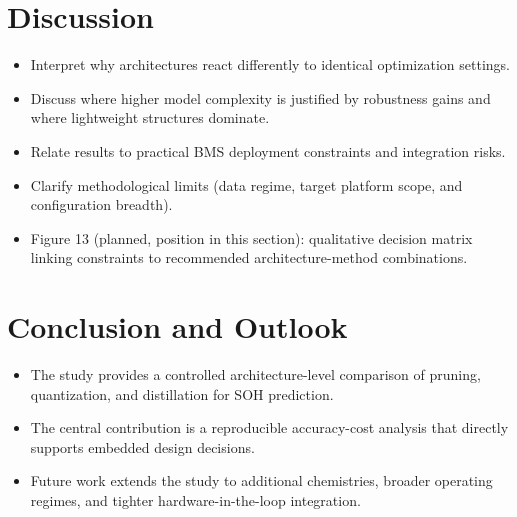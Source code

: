 ﻿\documentclass[review]{elsarticle}
\begin{document}
\section{Discussion}
\begin{itemize}[leftmargin=*]
\item Interpret why architectures react differently to identical optimization settings.
\item Discuss where higher model complexity is justified by robustness gains and where lightweight structures dominate.
\item Relate results to practical BMS deployment constraints and integration risks.
\item Clarify methodological limits (data regime, target platform scope, and configuration breadth).
\item Figure 13 (planned, position in this section): qualitative decision matrix linking constraints to recommended architecture-method combinations.
\end{itemize}

\section{Conclusion and Outlook}
\begin{itemize}[leftmargin=*]
\item The study provides a controlled architecture-level comparison of pruning, quantization, and distillation for SOH prediction.
\item The central contribution is a reproducible accuracy-cost analysis that directly supports embedded design decisions.
\item Future work extends the study to additional chemistries, broader operating regimes, and tighter hardware-in-the-loop integration.
\end{itemize}
\end{document}
